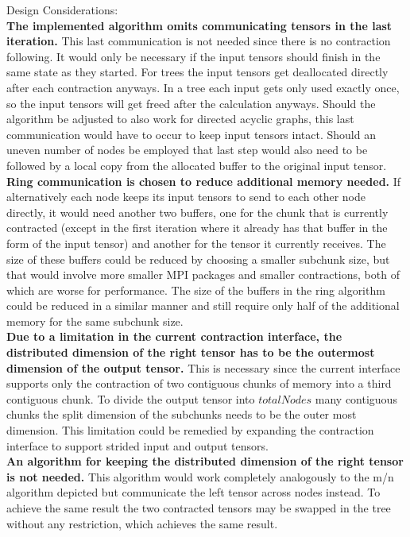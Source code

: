 Design Considerations:\\
\textbf{The implemented algorithm omits communicating tensors in the last iteration.}
This last communication is not needed since there is no contraction following.
It would only be necessary if the input tensors should finish in the same state as they started.
For trees the input tensors get deallocated directly after each contraction anyways.
In a tree each input gets only used exactly once, so the input tensors will get freed after the calculation anyways.
Should the algorithm be adjusted to also work for directed acyclic graphs, this last communication would have to occur to keep input tensors intact.
Should an uneven number of nodes be employed that last step would also need to be followed by a local copy from the allocated buffer to the original input tensor.\\
\textbf{Ring communication is chosen to reduce additional memory needed.}
If alternatively each node keeps its input tensors to send to each other node directly, it would need another two buffers, one for the chunk that is currently contracted (except in the first iteration where it already has that buffer in the form of the input tensor) and another for the tensor it currently receives.
The size of these buffers could be reduced by choosing a smaller subchunk size, but that would involve more smaller MPI packages and smaller contractions, both of which are worse for performance.
The size of the buffers in the ring algorithm could be reduced in a similar manner and still require only half of the additional memory for the same subchunk size.\\
\textbf{Due to a limitation in the current contraction interface, the distributed dimension of the right tensor has to be the outermost dimension of the output tensor.}
This is necessary since the current interface supports only the contraction of two contiguous chunks of memory into a third contiguous chunk.
To divide the output tensor into $totalNodes$ many contiguous chunks the split dimension of the subchunks needs to be the outer most dimension.
This limitation could be remedied by expanding the contraction interface to support strided input and output tensors.\\
\textbf{An algorithm for keeping the distributed dimension of the right tensor is not needed.}
This algorithm would work completely analogously to the m/n algorithm depicted but communicate the left tensor across nodes instead.
To achieve the same result the two contracted tensors may be swapped in the tree without any restriction, which achieves the same result.

